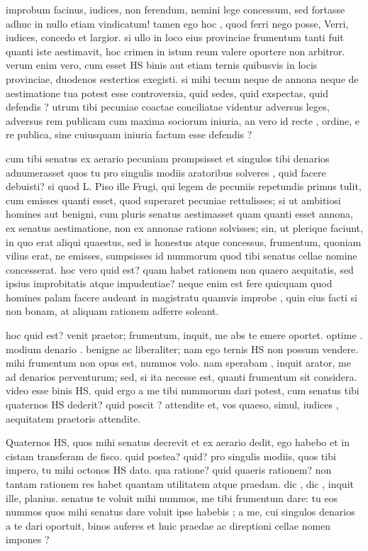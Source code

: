  improbum facinus, iudices, non ferendum, nemini lege concessum, sed fortasse adhuc in nullo etiam vindicatum! tamen ego hoc , quod ferri nego posse, Verri, iudices, concedo et largior. si ullo in loco eius provinciae frumentum tanti fuit quanti iste aestimavit, hoc crimen in istum reum valere oportere non arbitror. verum enim vero, cum esset HS binis aut etiam ternis quibusvis in locis provinciae, duodenos sestertios exegisti. si mihi tecum neque de annona neque de aestimatione tua potest esse controversia, quid sedes, quid exspectas, quid defendis ? utrum tibi pecuniae coactae conciliatae videntur adversus leges, adversus rem publicam cum maxima sociorum iniuria, an vero id recte , ordine, e re publica, sine cuiusquam iniuria factum esse defendis ?

 cum tibi senatus ex aerario pecuniam prompsisset et singulos tibi denarios adnumerasset quos tu pro singulis modiis aratoribus solveres , quid facere debuisti? si quod L. Piso ille Frugi, qui legem de pecuniis repetundis primus tulit, cum emisses quanti esset, quod superaret pecuniae rettulisses; si ut ambitiosi homines aut benigni, cum pluris senatus aestimasset quam quanti esset annona, ex senatus aestimatione, non ex annonae ratione solvisses; sin, ut plerique faciunt, in quo erat aliqui quaestus, sed is honestus atque concessus, frumentum, quoniam vilius erat, ne emisses, sumpsisses id nummorum quod tibi senatus cellae nomine concesserat. hoc vero quid est? quam habet rationem non quaero aequitatis, sed ipsius improbitatis atque impudentiae? neque enim est fere quicquam quod homines palam facere audeant in magistratu quamvis improbe , quin eius facti si non bonam, at aliquam rationem adferre soleant.

 hoc quid est? venit praetor; frumentum, inquit, me abs te emere oportet. optime . modium denario . benigne ac liberaliter; nam ego ternis HS non possum vendere. mihi frumentum non opus est, nummos volo. nam sperabam , inquit arator, me ad denarios perventurum; sed, si ita necesse est, quanti frumentum sit considera. video esse binis HS. quid ergo a me tibi nummorum dari potest, cum senatus tibi quaternos HS dederit? quid poscit ? attendite et, vos quaeso, simul, iudices , aequitatem praetoris attendite.

 Quaternos HS, quos mihi senatus decrevit et ex aerario dedit, ego habebo et in cistam transferam de fisco. quid postea? quid? pro singulis modiis, quos tibi impero, tu mihi octonos HS dato. qua ratione? quid quaeris rationem? non tantam rationem res habet quantam utilitatem atque praedam. dic , dic , inquit ille, planius. senatus te voluit mihi nummos, me tibi frumentum dare: tu eos nummos quos mihi senatus dare voluit ipse habebis ; a me, cui singulos denarios a te dari oportuit, binos auferes et huic praedae ac direptioni cellae nomen impones ?

